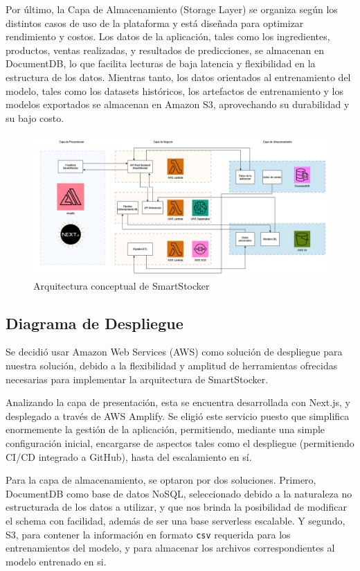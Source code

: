 Por último, la Capa de Almacenamiento (Storage Layer) se organiza según los distintos casos de uso de la plataforma y está diseñada para optimizar rendimiento y costos. Los datos de la aplicación, tales como los ingredientes, productos, ventas realizadas,  y resultados de predicciones, se almacenan en DocumentDB, lo que facilita lecturas de baja latencia y flexibilidad en la estructura de los datos. Mientras tanto, los datos orientados al entrenamiento del modelo, tales como los datasets históricos, los artefactos de entrenamiento y los modelos exportados se almacenan en Amazon S3, aprovechando su durabilidad y su bajo costo.

\begin{figure}[htbp]
    \centering
    \includegraphics[width=1\textwidth]{images/arquitectura_capas.png}
    \caption{Arquitectura conceptual de SmartStocker}
    \label{fig:arquitectura-conceptual}
\end{figure}

\subsection{Diagrama de Despliegue}\label{sec:arquitectura-despliegue}
Se decidió usar Amazon Web Services (AWS) como solución de despliegue para nuestra solución, debido a la flexibilidad y amplitud de herramientas ofrecidas necesarias para implementar la arquitectura de SmartStocker.

Analizando la capa de presentación, esta se encuentra desarrollada con Next.js, y desplegado a través de AWS Amplify. Se eligió este servicio puesto que simplifica enormemente la gestión de la aplicación, permitiendo, mediante una simple configuración inicial, encargarse de aspectos tales como el despliegue (permitiendo CI/CD integrado a GitHub), hasta del escalamiento en sí.

Para la capa de almacenamiento, se optaron por dos soluciones. Primero, DocumentDB como base de datos NoSQL, seleccionado debido a la naturaleza no estructurada de los datos a utilizar, y que nos brinda la posibilidad de modificar el schema con facilidad, además de ser una base serverless escalable. Y segundo, S3, para contener la información en formato \verb|csv| requerida para los entrenamientos del modelo, y para almacenar los archivos correspondientes al modelo entrenado en si.

